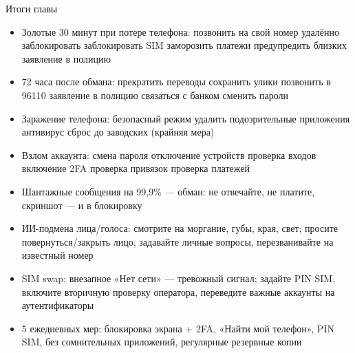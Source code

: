 \begin{tcbsummary}{Итоги главы}
\begin{itemize}
  \item Золотые 30 минут при потере телефона: позвонить на свой номер удалённо заблокировать заблокировать SIM заморозить платежи предупредить близких заявление в полицию
  \item 72 часа после обмана: прекратить переводы сохранить улики позвонить в 96110 заявление в полицию связаться с банком сменить пароли
  \item Заражение телефона: безопасный режим удалить подозрительные приложения антивирус сброс до заводских (крайняя мера)
  \item Взлом аккаунта: смена пароля отключение устройств проверка входов включение 2FA проверка привязок проверка платежей
  \item Шантажные сообщения на 99,9\% — обман: не отвечайте, не платите, скриншот — и в блокировку
  \item ИИ-подмена лица/голоса: смотрите на моргание, губы, края, свет; просите повернуться/закрыть лицо, задавайте личные вопросы, перезванивайте на известный номер
  \item SIM swap: внезапное «Нет сети» — тревожный сигнал; задайте PIN SIM, включите вторичную проверку оператора, переведите важные аккаунты на аутентификаторы
  \item 5 ежедневных мер: блокировка экрана + 2FA, «Найти мой телефон», PIN SIM, без сомнительных приложений, регулярные резервные копии
\end{itemize}

\end{tcbsummary}
